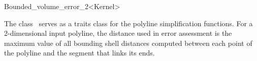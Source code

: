 
\begin{ccRefClass}{Bounded_volume_error_2<Kernel>}

\ccDefinition
  
The class \ccRefName\ serves as a traits class for the polyline simplification functions.   
For a 2-dimensional input polyline, the distance used in error assessment is the maximum value 
of all bounding shell distances computed between each point of the polyline and the segment that links its ends.


\ccIsModel



\ccTypes


\ccSeeAlso


\end{ccRefClass}

